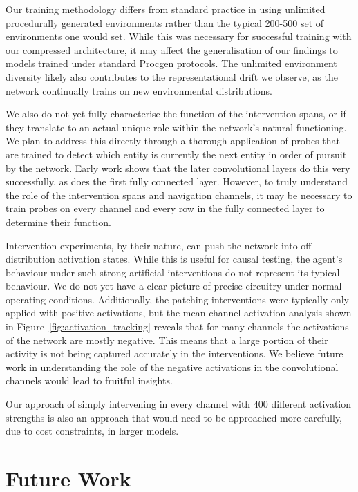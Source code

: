 Our training methodology differs from standard practice in using unlimited procedurally generated environments rather than the typical 200-500 set of environments one would set. While this was necessary for successful training with our compressed architecture, it may affect the generalisation of our findings to models trained under standard Procgen protocols. The unlimited environment diversity likely also contributes to the representational drift we observe, as the network continually trains on new environmental distributions.

We also do not yet fully characterise the function of the intervention spans, or if they translate to an actual unique role within the network's natural functioning. We plan to address this directly through a thorough application of probes that are trained to detect which entity is currently the next entity in order of pursuit by the network. Early work shows that the later convolutional layers do this very successfully, as does the first fully connected layer. However, to truly understand the role of the intervention spans and navigation channels, it may be necessary to train probes on every channel and every row in the fully connected layer to determine their function.

Intervention experiments, by their nature, can push the network into off-distribution activation states. While this is useful for causal testing, the agent's behaviour under such strong artificial interventions do not represent its typical behaviour. We do not yet have a clear picture of precise circuitry under normal operating conditions. Additionally, the patching interventions were typically only applied with positive activations, but the mean channel activation analysis shown in Figure~\ref{fig:activation_tracking} reveals that for many channels the activations of the network are mostly negative. This means that a large portion of their activity is not being captured accurately in the interventions. We believe future work in understanding the role of the negative activations in the convolutional channels would lead to fruitful insights.

Our approach of simply intervening in every channel with 400 different activation strengths is also an approach that would need to be approached more carefully, due to cost constraints, in larger models.

\section{Future Work}\label{sec:future_work}

